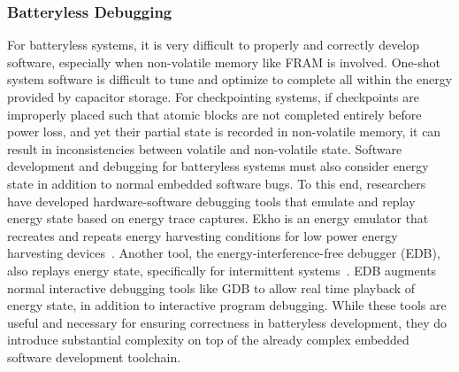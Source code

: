 \subsubsection{Batteryless Debugging}
For batteryless systems, it
is very difficult to properly and correctly develop software, especially when non-volatile memory like FRAM is involved.
One-shot system software is difficult to tune and optimize to complete all within the energy provided by capacitor storage.
For checkpointing systems, if checkpoints are improperly placed such that atomic blocks are not completed entirely before power loss, and yet their partial state is recorded in non-volatile memory,
it can result in inconsistencies between volatile and non-volatile state.
Software development and debugging for batteryless systems must also consider energy state in addition to normal embedded software bugs.
To this end, researchers have developed hardware-software debugging tools that emulate and replay energy state based on energy trace captures.
Ekho is an energy emulator that recreates and repeats energy harvesting conditions for low power energy harvesting devices~\cite{hester2014ekho}.
Another tool, the energy-interference-free debugger (EDB), also replays energy state, specifically for intermittent systems~\cite{colin2016energy}.
EDB augments normal interactive debugging tools like GDB to allow real time playback of energy state, in addition to interactive program debugging.
While these tools are useful and necessary for ensuring correctness in batteryless development, they do introduce substantial complexity on top of the already complex embedded software development toolchain.

